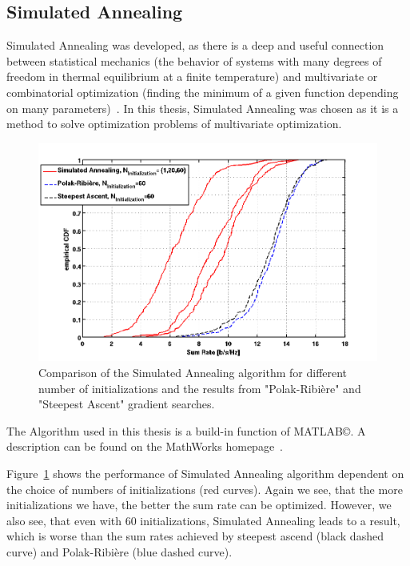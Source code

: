 \subsection{Simulated Annealing}
\label{sec:sim_annealing}
Simulated Annealing was developed, as there is a deep and useful connection between statistical mechanics (the behavior of systems with many degrees of freedom in thermal equilibrium at a finite temperature) and multivariate or combinatorial optimization (finding the minimum of a given function depending on many parameters)~\cite{Kirkpatrick83}.
In this thesis, Simulated Annealing was chosen as it is a method to solve optimization problems of multivariate optimization.
\begin{figure}[h]
\centering
  \includegraphics[width=0.8\linewidth]{images/Simannealcomparison.png}
\caption{Comparison of the Simulated Annealing algorithm for different number of initializations and the results from "Polak-Ribi\`{e}re" and "Steepest Ascent" gradient searches.}
\label{fig:heur_sa}
\end{figure}

The Algorithm used in this thesis is a build-in function of MATLAB\copyright.
A description can be found on the MathWorks homepage~\cite{matlab:simulann}.



Figure~\ref{fig:heur_sa} shows the performance of Simulated Annealing algorithm dependent on the choice of numbers of initializations (red curves).
Again we see, that the more initializations we have, the better the sum rate can be optimized.
However, we also see, that even with 60 initializations, Simulated Annealing leads to a result, which is worse than the sum rates achieved by steepest ascend (black dashed curve) and Polak-Ribi\`{e}re (blue dashed curve).


